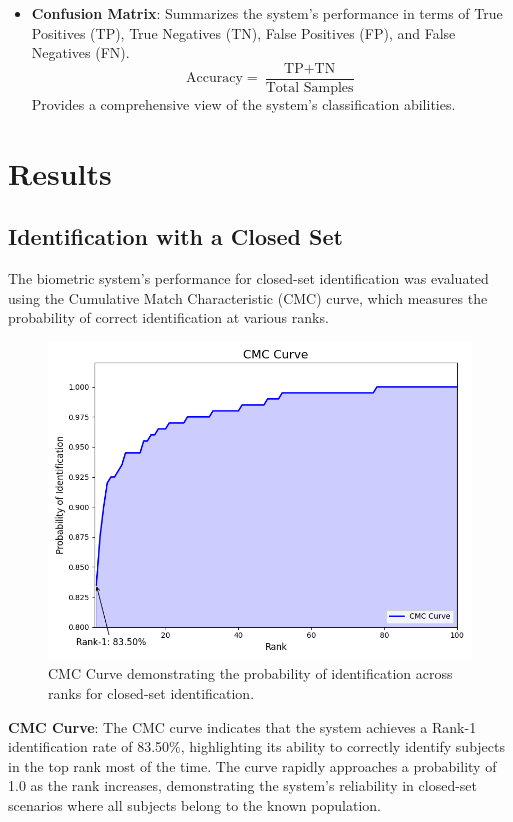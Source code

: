 \begin{itemize}
    \item \textbf{Confusion Matrix}:  
    Summarizes the system's performance in terms of True Positives (TP), True Negatives (TN), False Positives (FP), and False Negatives (FN).  
    \[
    \text{Accuracy} = \frac{\text{TP} + \text{TN}}{\text{Total Samples}}
    \]
    Provides a comprehensive view of the system's classification abilities.

\end{itemize}
\section{Results}

\subsection{Identification with a Closed Set}

The biometric system's performance for closed-set identification was evaluated using the Cumulative Match Characteristic (CMC) curve, which measures the probability of correct identification at various ranks.

\begin{figure}[!ht]
    \centering
    \includegraphics[width=\columnwidth]{./images/plots/id-close/cmc_curve.png}
    \caption{CMC Curve demonstrating the probability of identification across ranks for closed-set identification.}
    \label{fig:cmc_curve}
\end{figure}

\textbf{CMC Curve}: The CMC curve indicates that the system achieves a Rank-1 identification rate of 83.50\%, highlighting its ability to correctly identify subjects in the top rank most of the time. The curve rapidly approaches a probability of 1.0 as the rank increases, demonstrating the system's reliability in closed-set scenarios where all subjects belong to the known population.


